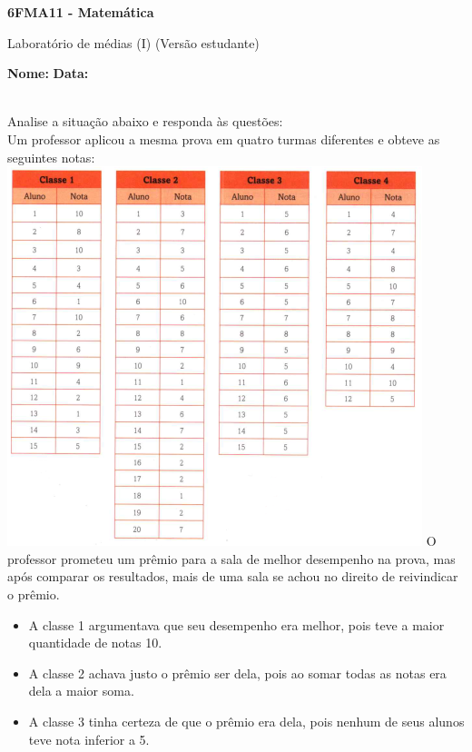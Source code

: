 \documentclass[a4paper,14pt]{article}
\begin{document}
	
	\noindent\textbf{6FMA11 - Matemática} 
	
	\begin{center}Laboratório de médias (I) (Versão estudante)
	\end{center}
	
	\noindent\textbf{Nome:} \underline{\hspace{10cm}}
	\noindent\textbf{Data:} \underline{\hspace{4cm}}
	
	
	\noindent \\ Analise a situação abaixo e responda às questões: \\
	Um professor aplicou a mesma prova em quatro turmas diferentes e obteve as seguintes notas: \\
	\includegraphics[width=1\linewidth]{6FMA11_imagens/imagem1}
	O professor prometeu um prêmio para a sala de melhor desempenho na prova, mas após comparar os resultados, mais de uma sala se achou no direito de reivindicar o prêmio.
	\begin{itemize}
		\item A classe 1 argumentava que seu desempenho era melhor, pois teve a maior quantidade de notas 10.
		\item A classe 2 achava justo o prêmio ser dela, pois ao somar todas as notas era dela a maior soma.
		\item A classe 3 tinha certeza de que o prêmio era dela, pois nenhum de seus alunos teve nota inferior a 5.
	\end{itemize}
\end{document}

